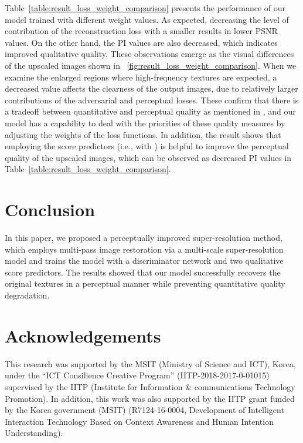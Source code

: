 \documentclass[runningheads]{llncs}
\begin{document}
Table~\ref{table:result_loss_weight_comparison} presents the performance of our model trained with different weight values.
As expected, decreasing the level of contribution of the reconstruction loss with a smaller  results in lower PSNR values.
On the other hand, the PI values are also decreased, which indicates improved qualitative quality.
These observations emerge as the visual differences of the upscaled images shown in \figurename~\ref{fig:result_loss_weight_comparison}.
When we examine the enlarged regions where high-frequency textures are expected, a decreased  value affects the clearness of the output images, due to relatively larger contributions of the adversarial and perceptual losses.
These confirm that there is a tradeoff between quantitative and perceptual quality as mentioned in \cite{blau2017perception}, and our model has a capability to deal with the priorities of these quality measures by adjusting the weights of the loss functions.
In addition, the result shows that employing the score predictors (i.e., with ) is helpful to improve the perceptual quality of the upscaled images, which can be observed as decreased PI values in Table~\ref{table:result_loss_weight_comparison}.


\section{Conclusion}
\label{sec:conclusion}

In this paper, we proposed a perceptually improved super-resolution method, which employs multi-pass image restoration via a multi-scale super-resolution model and trains the model with a discriminator network and two qualitative score predictors.
The results showed that our model successfully recovers the original textures in a perceptual manner while preventing quantitative quality degradation.




\section*{Acknowledgements}

This research was supported by the MSIT (Ministry of Science and ICT), Korea, under the ``ICT Consilience Creative Program'' (IITP-2018-2017-0-01015) supervised by the IITP (Institute for Information \& communications Technology Promotion). In addition, this work was also supported by the IITP grant funded by the Korea government (MSIT) (R7124-16-0004, Development of Intelligent Interaction Technology Based on Context Awareness and Human Intention Understanding).



\end{document}
